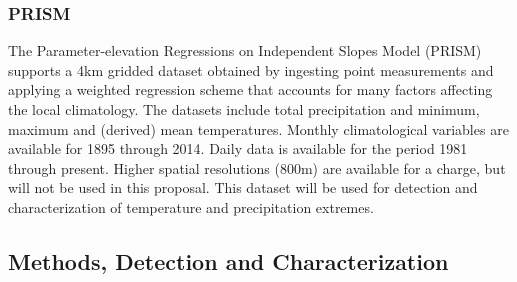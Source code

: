 \documentclass[11pt]{article}
\newcommand\citep{\cite}
\begin{document}
\subsubsection*{PRISM} \label{sec:PRISM}

The Parameter-elevation Regressions on Independent Slopes Model (PRISM) \citep{daly2008physiographically} supports a 4km gridded dataset obtained by ingesting point measurements and applying a weighted regression scheme that accounts for many factors affecting the local climatology.  The datasets include total precipitation and minimum, maximum and (derived) mean temperatures.  Monthly climatological variables are available for 1895 through 2014.  Daily data is available for the period 1981 through present.  Higher spatial resolutions (800m) are available for a charge, but will not be used in this proposal.  This dataset will be used for detection and characterization of temperature and precipitation extremes.






\subsection{Methods, Detection and Characterization} \label{sec:Methods}
\end{document}
